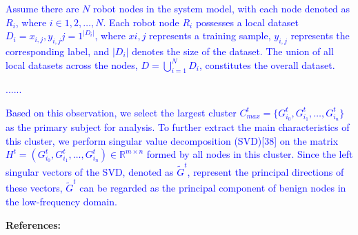 \documentclass[a4paper,twoside,11pt,dvipsnames]{reviewresponse}
\begin{document}
\textcolor{blue}{Assume there are $N$ robot nodes in the system model, with each node denoted as $R_i$, where $i \in {1, 2, \ldots, N}$. Each robot node $R_i$ possesses a local dataset $D_i = {x_{i,j}, y_{i,j}}{j=1}^{|D_i|}$, where $x{i,j}$ represents a training sample, $y_{i,j}$ represents the corresponding label, and $|D_i|$ denotes the size of the dataset. The union of all local datasets across the nodes, $D = \bigcup_{i=1}^{N} D_i$, constitutes the overall dataset.}

\textcolor{blue}{......}

\textcolor{blue}{Based on this observation, we select the largest cluster \(C^t_{max} = \{G^t_{i_0}, G^t_{i_1}, \ldots, G^t_{i_n}\}\) as the primary subject for analysis. To further extract the main characteristics of this cluster, we perform singular value decomposition (SVD)[38] on the matrix $H^t = (G^t_{i_0}, G^t_{i_1}, \ldots, G^t_{i_n}) \in \mathbb{R}^{m \times n}$ formed by all nodes in this cluster. Since the left singular vectors of the SVD, denoted as \(\tilde{G}^t\), represent the principal directions of these vectors, \(\tilde{G}^t\) can be regarded as the principal component of benign nodes in the low-frequency domain.}



\newpage

\textbf{\hspace{6.5cm}References:}







\end{document}
